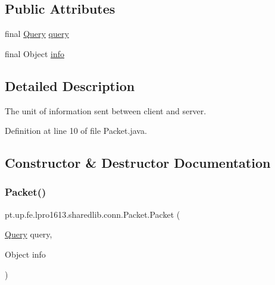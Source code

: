 \subsection*{Public Attributes}
\begin{DoxyCompactItemize}
\item 
final \hyperlink{enumpt_1_1up_1_1fe_1_1lpro1613_1_1sharedlib_1_1conn_1_1_query}{Query} \hyperlink{classpt_1_1up_1_1fe_1_1lpro1613_1_1sharedlib_1_1conn_1_1_packet_acdc36b134a4d54ae9d3358264584864b}{query}
\item 
final Object \hyperlink{classpt_1_1up_1_1fe_1_1lpro1613_1_1sharedlib_1_1conn_1_1_packet_aa45162e897c5b5a34e4d6c4632cbc096}{info}
\end{DoxyCompactItemize}


\subsection{Detailed Description}
The unit of information sent between client and server. 

Definition at line 10 of file Packet.\+java.



\subsection{Constructor \& Destructor Documentation}
\hypertarget{classpt_1_1up_1_1fe_1_1lpro1613_1_1sharedlib_1_1conn_1_1_packet_aeae6b0942efe9aff4aa95a95bdbd89a0}{}\label{classpt_1_1up_1_1fe_1_1lpro1613_1_1sharedlib_1_1conn_1_1_packet_aeae6b0942efe9aff4aa95a95bdbd89a0} 
\subsubsection{\texorpdfstring{Packet()}{Packet()}\hspace{0.1cm}{\footnotesize\ttfamily [1/3]}}
{\footnotesize\ttfamily pt.\+up.\+fe.\+lpro1613.\+sharedlib.\+conn.\+Packet.\+Packet (\begin{DoxyParamCaption}\item[{\hyperlink{enumpt_1_1up_1_1fe_1_1lpro1613_1_1sharedlib_1_1conn_1_1_query}{Query}}]{query,  }\item[{Object}]{info }\end{DoxyParamCaption})}

